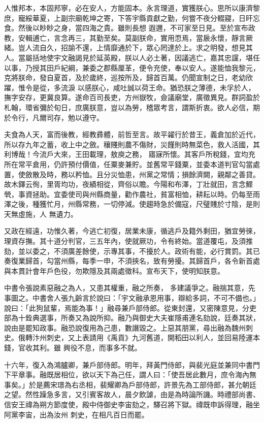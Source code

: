 \begin{pinyinscope}
 人惟邦本，本固邦寧，必在安人，方能固本。永言理道，實獲朕心。思所以康濟黎庶，寵綏華夏，上副宗廟乾坤之寄，下答宇縣貢獻之勤，何嘗不夜分輟寢，日旰忘食。然後以眇眇之身，當四海之貴。雖則長想
 遐邇，不可家至日見。至於宣布政教，安輯逋亡，言念再三，其勤至矣。莫副朕命，實用恧焉，當扆永懷，靜言厥緒。豈人流自久，招諭不還，上情靡通於下，眾心罔達於上。求之明發，想見其人。當屬括地使宇文融謁見於延英殿，朕以人必土著，因議逃亡，嘉其忠讜，堪任以事，乃授其田戶紀綱，兼委之郡縣厘革，便令充使，奉以安人。遂能恤我黎元，克將朕命，發自夏首，及於歲終，巡按所及，歸首百萬。仍聞宣制之日，老幼欣躍，惟令是從，多流淚
 以感朕心，咸吐誠以荷王命。猶恐朕之薄德，未孚於人，撫字安存，更冀良算。遂命百司長吏，方州嶽牧，僉議廟堂，廣徵異見。群詞盈於札翰，環省彌於旬日，庶廣朕意，豈以為勞，稽眾考言，謂斯折衷。欲人必信，期於令行，凡爾司存，勉以遵守。



 夫食為人天，富而後教，經教彞體，前哲至言。故平糴行於昔王，義倉加於近代，所以存九年之蓄，收上中之斂。穰賤則農不傷財，災饉則時無菜色，救人活國，其利博哉！今流戶大來，王田載理，敖庾之務，
 寤寐所懷。其客戶所稅錢，宜均充所在常平倉用，仍許預付價值，任粟麥兼貯。並舊常平錢粟，並委本道判官勾當處置，使斂散及時，務以矜恤。且分災恤患，州黨之常情；損餘濟闕，親鄰之善貸。故木鐸云徇，里胥均功，夜績相從，齊俗以贍。今陽和布澤，丁壯就田，言念鰥煢，事資拯助。宜委使司與州縣商量，勸作農社，貧富相恤，耕耘以時。仍每至雨澤之後，種獲忙月，州縣常務，一切停減。使趨時急於備寇，尺璧賤於寸陰，是則天無虛施，人
 無遺力。



 又政在經遠，功惟久著，今逃亡初復，居業未康，循逃戶及籍外剩田，猶宜勞徠，理資存撫。其十道分判官，三五年內，使就厥功，令有終始。當道覆屯，及須推劾，並以委之，不須廣差餘使，示專其事，不擾於人。政術有能，必行賞罰。其已奏復業歸首，勾當州縣，每季一申，不須挾名，致有勞擾。其歸首戶，各令新首處與本貫計會年戶色役，勿欺隱及其兩處徵科。宣布天下，使明知朕意。



 中書令張說素惡融之為人，又患其權重，融之所奏，
 多建議爭之。融揣其意，先事圖之。中書舍人張九齡言於說曰：「宇文融承恩用事，辯給多詞，不可不備也。」說曰：「此狗鼠輩，焉能為事！」融尋兼戶部侍郎。從東封還，又密陳意見，分吏部為十銓典選事，所奏又為說所抑。融乃與御史大夫崔隱甫連名劾說，廷奏其狀，說由是罷知政事。融恐說復用為己患，數譖毀之。上惡其朋黨，尋出融為魏州刺史。俄轉汴州刺史，又上表請用《禹貢》九河舊道，開稻田以利人，並回易陸運本錢，官收其利。雖
 興役不息，而事多不就。



 十六年，復入為鴻臚卿，兼戶部侍郎。明年，拜黃門侍郎，與裴光庭並兼同中書門下平章事。融既居相位，欲以天下為己任，謂人曰：「使吾居此數月，庶令海內無事矣。」於是薦宋璟為右丞相，裴耀卿為戶部侍郎，許景先為工部侍郎，甚允朝廷之望。然性躁急多言，又引賓客故人，晨夕飲謔，由是為時論所譏。時禮部尚書、信安王禕為朔方節度使，殿中侍御史李宙劾之，驛召將下獄。禕既申訴得理，融坐阿黨李宙，出為汝州
 刺史，在相凡百日而罷。




\end{pinyinscope}
